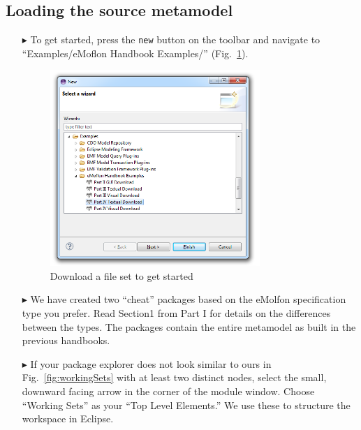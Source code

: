 \subsection{Loading the source metamodel}
\label{sec:loadSourceMeta}
\begin{itemize}

\item[$\blacktriangleright$] To get started, press the \texttt{new} button on the toolbar and navigate to ``Examples/eMoflon Handbook Examples/''
(Fig.~\ref{fig:downPartIV}).

\begin{figure}[htbp]
\begin{center}
  \includegraphics[width=0.75\textwidth]{eclipse_downloadWizardPartIV}
  \caption{Download a file set to get started}
  \label{fig:downPartIV}
\end{center}
\end{figure}

\clearpage

\item[$\blacktriangleright$] We have created two ``cheat'' packages based on the eMolfon specification type you prefer. Read Section1 from Part I for details on
the differences between the types. The packages contain the entire metamodel as built in the previous handbooks.

\item[$\blacktriangleright$] If your package explorer does not look similar to ours in Fig.~\ref{fig:workingSets} with at least two distinct nodes, select the
small, downward facing arrow in the corner of the module window. Choose ``Working Sets'' as your ``Top Level Elements.'' We use these to structure the
workspace in Eclipse.


\end{itemize}

